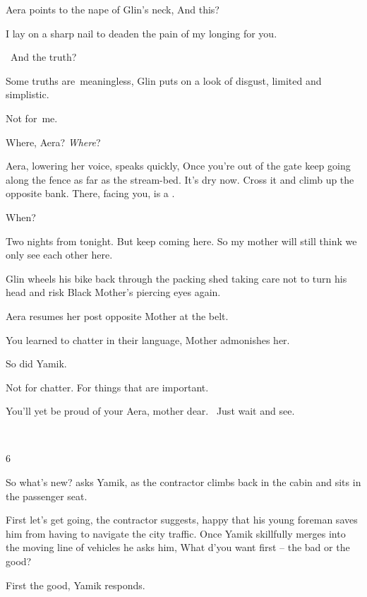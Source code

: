 \documentclass[letterpaper]{article}
\begin{document}
Aera points to the nape of Glin's neck, {\textquotedbl}And this?{\textquotedbl}

{\textquotedbl}I lay on a sharp nail to deaden the pain of my longing for you.{\textquotedbl}

~{\textquotedbl}And the truth?{\textquotedbl} 

{\textquotedbl}Some truths are~meaningless,{\textquotedbl} Glin puts on a look of disgust, {\textquotedbl}limited and
simplistic.{\textquotedbl}

{\textquotedbl}Not for~me.{\textquotedbl}~ 

{\textquotedbl}Where, Aera? \textit{Where}?{\textquotedbl}

Aera, lowering her voice, speaks quickly, {\textquotedbl}Once you're out of the gate keep going along the fence as far
as the stream-bed. It's dry now. Cross it and climb up the opposite bank. There, facing you, is a .{\textquotedbl}

{\textquotedbl}When?{\textquotedbl}

{\textquotedbl}Two nights from tonight. But keep coming here. So my mother will still think we only see each other
here.{\textquotedbl}

Glin wheels his bike back through the packing shed taking care not to turn his head and risk Black Mother's piercing
eyes again.

Aera resumes her post opposite Mother at the belt. 

{\textquotedbl}You learned to chatter in their language,{\textquotedbl} Mother admonishes her.

{\textquotedbl}So did Yamik.{\textquotedbl}

{\textquotedbl}Not for chatter. For things that are important.{\textquotedbl}

{\textquotedbl}You'll yet be proud of your Aera, mother dear.~ Just wait and see.{\textquotedbl}

~

6 

{\textquotedbl}So what's new?{\textquotedbl} asks Yamik, as the contractor climbs back in the cabin and sits in the
passenger seat. 

{\textquotedbl}First let's get going,{\textquotedbl} the contractor suggests, happy that his young foreman saves him
from having to navigate the city traffic. Once Yamik skillfully merges into the moving line of vehicles he asks him,
{\textquotedbl}What d'you want first -- the bad or the good?{\textquotedbl} 

{\textquotedbl}First the good,{\textquotedbl} Yamik responds. 
\end{document}
